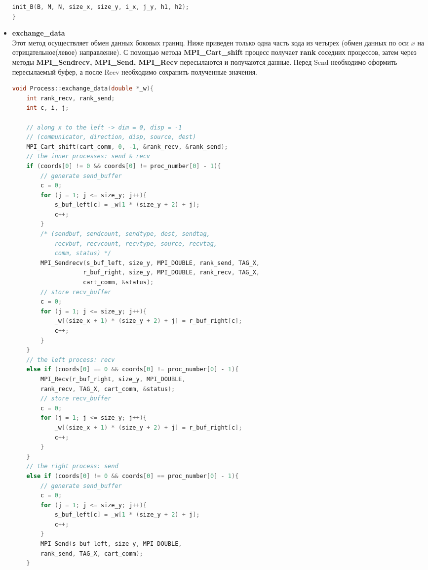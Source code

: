 \documentclass{article}
\begin{document}
\begin{itemize}
\begin{lstlisting}[language=C, caption=Process::fill\_data()]
    init_B(B, M, N, size_x, size_y, i_x, j_y, h1, h2);
}
    \end{lstlisting}
    \item \textbf{exchange\_data}\\
    Этот метод осуществляет обмен данных боковых границ. Ниже приведен только одна часть кода из четырех (обмен данных по оси $x$ на отрицательное(левое) направление). С помощью метода \textbf{MPI\_Cart\_shift} процесс получает \textbf{rank} соседних процессов, затем через методы \textbf{MPI\_Sendrecv, MPI\_Send, MPI\_Recv} пересылаются и получаются данные. Перед Send необходимо оформить пересылаемый буфер, а после Recv необходимо сохранить полученные значения. 
    \begin{lstlisting}[language=C, caption=Process::exchange\_data()]
void Process::exchange_data(double *_w){
    int rank_recv, rank_send;
    int c, i, j;

    // along x to the left -> dim = 0, disp = -1
    // (communicator, direction, disp, source, dest)
    MPI_Cart_shift(cart_comm, 0, -1, &rank_recv, &rank_send);
    // the inner processes: send & recv
    if (coords[0] != 0 && coords[0] != proc_number[0] - 1){
        // generate send_buffer
        c = 0;
        for (j = 1; j <= size_y; j++){
            s_buf_left[c] = _w[1 * (size_y + 2) + j];
            c++;
        }
        /* (sendbuf, sendcount, sendtype, dest, sendtag, 
            recvbuf, recvcount, recvtype, source, recvtag, 
            comm, status) */
        MPI_Sendrecv(s_buf_left, size_y, MPI_DOUBLE, rank_send, TAG_X, 
                    r_buf_right, size_y, MPI_DOUBLE, rank_recv, TAG_X,
                    cart_comm, &status);
        // store recv_buffer
        c = 0;
        for (j = 1; j <= size_y; j++){
            _w[(size_x + 1) * (size_y + 2) + j] = r_buf_right[c];
            c++;
        }   
    }
    // the left process: recv
    else if (coords[0] == 0 && coords[0] != proc_number[0] - 1){
        MPI_Recv(r_buf_right, size_y, MPI_DOUBLE,
        rank_recv, TAG_X, cart_comm, &status);
        // store recv_buffer
        c = 0;
        for (j = 1; j <= size_y; j++){
            _w[(size_x + 1) * (size_y + 2) + j] = r_buf_right[c];
            c++;
        }
    }
    // the right process: send
    else if (coords[0] != 0 && coords[0] == proc_number[0] - 1){
        // generate send_buffer
        c = 0;
        for (j = 1; j <= size_y; j++){
            s_buf_left[c] = _w[1 * (size_y + 2) + j];
            c++;
        }
        MPI_Send(s_buf_left, size_y, MPI_DOUBLE,
        rank_send, TAG_X, cart_comm);
    }
    

\end{lstlisting}
\end{itemize}
\end{document}
